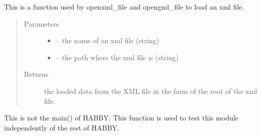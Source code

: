 \documentclass[letterpaper,10pt,english]{sphinxmanual}
\begin{document}
\begin{fulllineitems}
\label{\detokenize{index:src.Hec_ras06.load_xml}}
This is a function used by openxml\_file and opengml\_file to load an xml file.
\begin{quote}\begin{description}
\item[{Parameters}] \leavevmode\begin{itemize}
\item {} 
 -- the name of an xml file (string)

\item {} 
 -- the path where the xml file is (string)

\end{itemize}

\item[{Returns}] \leavevmode
the loaded data from the XML file in the form of the root of the xml file.

\end{description}\end{quote}

\end{fulllineitems}


\begin{fulllineitems}
\label{\detokenize{index:src.Hec_ras06.main}}
This is not the main() of HABBY. This function is used to test this module independently of the rest of HABBY.

\end{fulllineitems}

\end{document}
